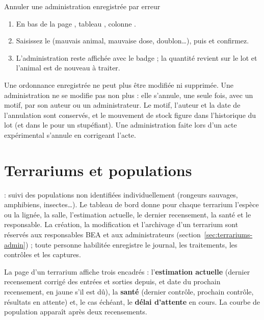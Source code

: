 \documentclass[11pt,a4paper]{article}
\begin{document}
\begin{procedure}{Annuler une administration enregistrée par erreur}
\begin{enumerate}
  \item En bas de la page , tableau , colonne .
  \item Saisissez le  (mauvais animal, mauvaise dose, doublon…),
    puis  et confirmez.
  \item L'administration reste affichée avec le badge  ; la quantité revient sur le lot et l'animal est
    de nouveau à traiter.
\end{enumerate}
\end{procedure}
\begin{trace}
Une ordonnance enregistrée ne peut plus être modifiée ni supprimée. Une
administration ne se modifie pas non plus : elle s'annule, une seule fois,
avec un motif, par son auteur ou un administrateur. Le motif, l'auteur et la
date de l'annulation sont conservés, et le mouvement de stock figure dans
l'historique du lot (et dans le  pour un
stupéfiant). Une administration faite lors d'un acte expérimental s'annule
en corrigeant l'acte.
\end{trace}

\section{Terrariums et populations}\label{sec:terrariums}
 : suivi des populations non
identifiées individuellement (rongeurs sauvages, amphibiens, insectes…). Le
tableau de bord donne pour chaque terrarium l'espèce ou la lignée, la salle,
l'estimation actuelle, le dernier recensement, la santé et le responsable.
La création, la modification et l'archivage d'un terrarium sont réservés aux
responsables BEA et aux administrateurs (section~\ref{sec:terrariums-admin}) ; toute personne habilitée enregistre le journal,
les traitements, les contrôles et les captures.


La page d'un terrarium affiche trois encadrés : l'\textbf{estimation
actuelle} (dernier recensement corrigé des entrées et sorties depuis, et date
du prochain recensement, en jaune s'il est dû), la \textbf{santé} (dernier
contrôle, prochain contrôle, résultats en attente) et, le cas échéant, le
\textbf{délai d'attente} en cours. La courbe de population apparaît après
deux recensements.
\end{document}
